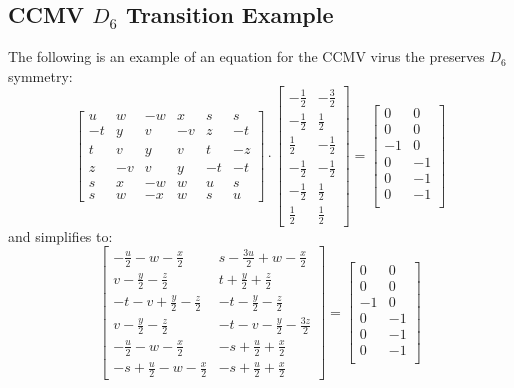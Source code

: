 \documentclass[a4paper,10pt]{article}
\theoremstyle{plain}
\theoremstyle{definition}
\theoremstyle{remark}
\begin{document}
\subsection{CCMV \( D_6 \) Transition Example}
The following is an example of an equation for the CCMV virus the preserves \(D_6\) symmetry:
\begin{equation}
	\renewcommand*{\arraystretch}{1.5}
	\begin{bmatrix}
		u  & w  & -w & x  & s  & s  \\
		-t & y  & v  & -v & z  & -t \\
		t  & v  & y  & v  & t  & -z \\
		z  & -v & v  & y  & -t & -t \\
		s  & x  & -w & w  & u  & s  \\
		s  & w  & -x & w  & s  & u
	\end{bmatrix}
	\cdot
	\begin{bmatrix}
		-\frac{1}{2} & -\frac{3}{2} \\
		-\frac{1}{2} & \frac{1}{2} \\
		\frac{1}{2} & -\frac{1}{2} \\
		-\frac{1}{2} & -\frac{1}{2} \\
		-\frac{1}{2} & \frac{1}{2} \\
		\frac{1}{2} & \frac{1}{2}
	\end{bmatrix}
	=
	\begin{bmatrix}
		0 & 0 \\
		0 & 0 \\
		-1 & 0 \\
		0 & -1 \\
		0 & -1 \\
		0 & -1 \\
	\end{bmatrix}
	\label{eq:ccmv_d6_example}
\end{equation}
and simplifies to:
\begin{equation}
	\renewcommand*{\arraystretch}{1.5}
	\begin{bmatrix}- \frac{u}{2} - w - \frac{x}{2} & s - \frac{3 u}{2} + w - \frac{x}{2}\\v - \frac{y}{2} - \frac{z}{2} & t + \frac{y}{2} + \frac{z}{2}\\- t - v + \frac{y}{2} - \frac{z}{2} & - t - \frac{y}{2} - \frac{z}{2}\\v - \frac{y}{2} - \frac{z}{2} & - t - v - \frac{y}{2} - \frac{3 z}{2}\\- \frac{u}{2} - w - \frac{x}{2} & - s + \frac{u}{2} + \frac{x}{2}\\- s + \frac{u}{2} - w - \frac{x}{2} & - s + \frac{u}{2} + \frac{x}{2}\end{bmatrix}
	=
	\begin{bmatrix}
		0 & 0 \\
		0 & 0 \\
		-1 & 0 \\
		0 & -1 \\
		0 & -1 \\
		0 & -1 \\
	\end{bmatrix}
	\label{eq:ccmv_d6_example_simplified}
\end{equation}
\end{document}
